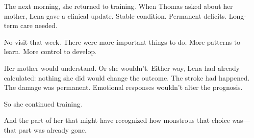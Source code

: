 The next morning, she returned to training. When Thomas asked about her mother, Lena gave a clinical update. Stable condition. Permanent deficits. Long-term care needed.

No visit that week. There were more important things to do. More patterns to learn. More control to develop.

Her mother would understand. Or she wouldn't. Either way, Lena had already calculated: nothing she did would change the outcome. The stroke had happened. The damage was permanent. Emotional responses wouldn't alter the prognosis.

So she continued training.

And the part of her that might have recognized how monstrous that choice was—that part was already gone.
